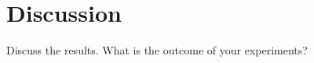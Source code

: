 \chapter{Discussion}\label{chap:discussion}


Discuss the results. What is the outcome of your experiments?